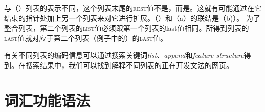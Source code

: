 \begin{enumerate}
与（）列表的表示不同，这个列表末尾的\textsc{rest}值不是，而是。这就有可能通过在它结束的指针处加上另一个列表来对它进行扩展。（）和（a）的联结是（b)）。
\eal
\ex 
{}
\ex
{}
\zl
为了整合列表，第二个列表的\textsc{list}值必须跟第一个列表的{\sc last}值相同。所得到列表的\textsc{last}值就对应于第二个列表（例子中的）的\textsc{last}值。

有关不同列表的编码信息可以通过搜索关键词\emph{list}、\emph{append}和\emph{feature structure}得到。在搜索结果中，我们可以找到解释不同列表的正在开发文法的网页。
\end{enumerate}



\section{词汇功能语法}

